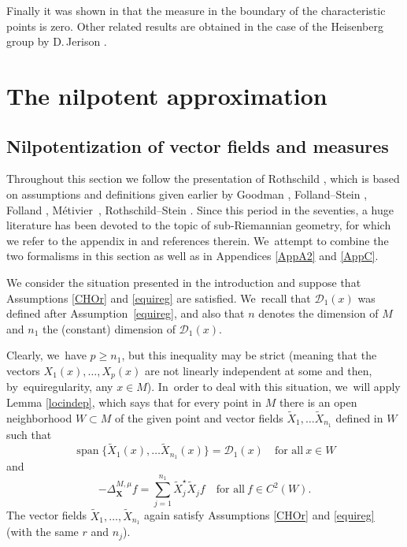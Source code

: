 \documentclass[JEP,XML,SOM,Unicode,published]{cedram}
\DeclareMathOperator{\Span}{span}
\newcommand{\bX}{{\boldsymbol{X}}}
\theoremstyle{definition}
\newcommand{\1}{\mathbbm{1}}
\begin{document}
Finally it was shown in \cite{De} that the measure in the boundary of the characteristic points is zero. Other related results are obtained in the case of the Heisenberg group by D.\,Jerison \cite{Jer}.

\section{The nilpotent approximation}\label{s1}

\subsection{Nilpotentization of vector fields and measures}
Throughout this section we follow the presentation of Rothschild \cite{Rot}, which is based on assumptions and definitions given earlier by Goodman \cite{Go}, Folland--Stein \cite{FS}, Folland \cite{Fo}, Métivier~\cite{Me}, Rothschild--Stein \cite{RS}. Since this period in the seventies, a huge literature has been devoted to the topic of sub-Riemannian geometry, for which we refer to the appendix in \cite{CHT} and references therein. We~attempt to combine the two formalisms in this section as well as in Appendices \ref{AppA2} and \ref{AppC}.

We consider the situation presented in the introduction and suppose that Assumptions \ref{CHOr} and \ref{equireg} are satisfied. We~recall that $\mathcal D_1(x)$ was defined after Assumption~\ref{equireg}, and also that $n$ denotes the dimension of $M$ and $n_1$ the (constant) dimension of $\mathcal D_1(x)$.

Clearly, we~have $p\geq n_1$, but this inequality may be strict (meaning that the vectors $X_1(x),\ldots,X_p(x)$ are not linearly independent at some and then, by~equiregularity, any $x\in M$). In~order to deal with this situation, we~will apply Lemma \ref{locindep}, which says that for every point in $M$ there is an open neighborhood $W\subset M$ of the given point and vector fields $\tilde X_1,\ldots \tilde X_{n_1}$ defined in $W$ such that
\begin{equation}
\label{eq:loclinindep}
\Span\{ \tilde X_1(x),\ldots \tilde X_{n_1}(x) \} = \mathcal D_1(x)
\quad\text{for all}\ x\in W
\end{equation}
and
\begin{equation}
\label{eq:loclinindeplapl}
-\Delta_\bX^{M,\mu} f = \sum_{j=1}^{n_1} \tilde X_j^\star \tilde X_j f
\quad\text{for all} \ f\in C^2(W).
\end{equation}
The vector fields $\tilde X_1,\ldots,\tilde X_{n_1}$ again satisfy Assumptions \ref{CHOr} and \ref{equireg} (with the same $r$ and $n_j$).
\end{document}
